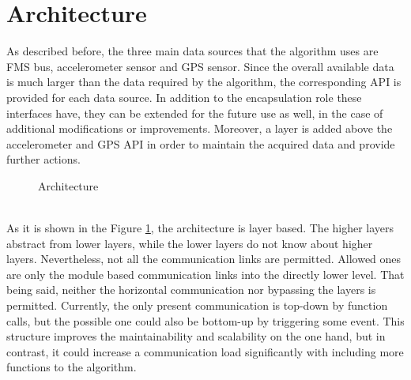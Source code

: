 \section{Architecture}

As described before, the three main data sources that the algorithm uses are FMS bus, accelerometer sensor and GPS sensor. Since the overall available data is much larger than the data required by the algorithm, the corresponding API is provided for each data source. In addition to the encapsulation role these interfaces have, they can be extended for the future use as well, in the case of additional modifications or improvements. Moreover, a layer is added above the accelerometer and GPS API in order to maintain the acquired data and provide further actions.
\begin{figure}[!htb]
	\caption{Architecture}
    \label{fig::architecture}
\end{figure}
\\
As it is shown in the Figure \ref{fig::architecture}, the architecture is layer based. The higher layers abstract from lower layers, while the lower layers do not know about higher layers. Nevertheless, not all the communication links are permitted. Allowed ones are only the module based communication links into the directly lower level. That being said, neither the horizontal communication nor bypassing the layers is permitted. Currently, the only present communication is top-down by function calls, but the possible one could also be bottom-up by triggering some event. This structure improves the maintainability and scalability on the one hand, but in contrast, it could increase a communication load significantly with including more functions to the algorithm. 
\clearpage
